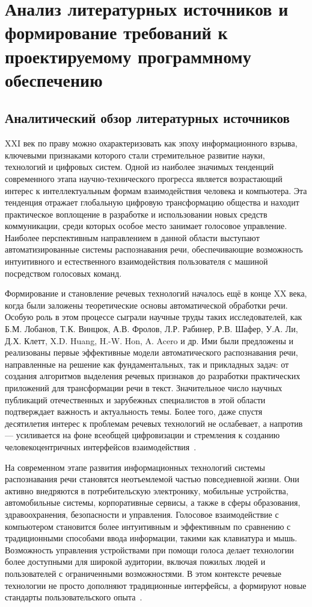 \section{Анализ литературных источников и формирование требований к проектируемому программному обеспечению}

\subsection{Аналитический обзор литературных источников}

XXI век по праву можно охарактеризовать как эпоху информационного взрыва, ключевыми признаками которого стали стремительное развитие науки, технологий и цифровых систем. Одной из наиболее значимых тенденций современного этапа научно-технического прогресса является возрастающий интерес к интеллектуальным формам взаимодействия человека и компьютера. Эта тенденция отражает глобальную цифровую трансформацию общества и находит практическое воплощение в разработке и использовании новых средств коммуникации, среди которых особое место занимает голосовое управление. Наиболее перспективным направлением в данной области выступают автоматизированные системы распознавания речи, обеспечивающие возможность интуитивного и естественного взаимодействия пользователя с машиной посредством голосовых команд.

Формирование и становление речевых технологий началось ещё в конце XX века, когда были заложены теоретические основы автоматической обработки речи. Особую роль в этом процессе сыграли научные труды таких исследователей, как Б.М. Лобанов, Т.К. Винцюк, А.В. Фролов, Л.Р. Рабинер, Р.В. Шафер, У.А. Ли, Д.Х. Клетт, X.D. Huang, H.-W. Hon, A. Acero и др. Ими были предложены и реализованы первые эффективные модели автоматического распознавания речи, направленные на решение как фундаментальных, так и прикладных задач: от создания алгоритмов выделения речевых признаков до разработки практических приложений для трансформации речи в текст. Значительное число научных публикаций отечественных и зарубежных специалистов в этой области подтверждает важность и актуальность темы. Более того, даже спустя десятилетия интерес к проблемам речевых технологий не ослабевает, а напротив — усиливается на фоне всеобщей цифровизации и стремления к созданию человекоцентричных интерфейсов взаимодействия~\cite{LL1}.

На современном этапе развития информационных технологий системы распознавания речи становятся неотъемлемой частью повседневной жизни. Они активно внедряются в потребительскую электронику, мобильные устройства, автомобильные системы, корпоративные сервисы, а также в сферы образования, здравоохранения, безопасности и управления. Голосовое взаимодействие с компьютером становится более интуитивным и эффективным по сравнению с традиционными способами ввода информации, такими как клавиатура и мышь. Возможность управления устройствами при помощи голоса делает технологии более доступными для широкой аудитории, включая пожилых людей и пользователей с ограниченными возможностями. В этом контексте речевые технологии не просто дополняют традиционные интерфейсы, а формируют новые стандарты пользовательского опыта~\cite{LL2}.

